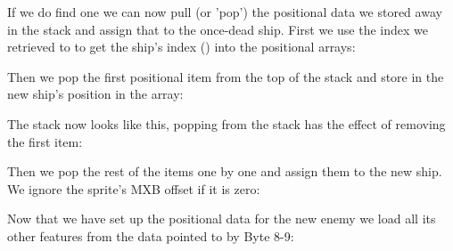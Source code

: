 %


If we do find one we can now pull (or 'pop') the positional data we stored away in the stack and assign that to the once-dead
ship. First we use the index we retrieved to  to get the ship's index () into the positional arrays:

%


Then we pop the first positional item  from the top of the stack and store in the new
ship's position in the array:

%


The stack now looks like this, popping from the stack has the effect of removing the first item:

\begin{figure}[H]
  {
    \setlength{\tabcolsep}{3.0pt}
    \setlength\cmidrulewidth{\heavyrulewidth} %
    \begin{adjustbox}{width=10cm,center}
    \end{adjustbox}

  }
\end{figure}

Then we pop the rest of the items one by one and assign them to the new ship. We ignore the sprite's MXB offset if it is
zero:
%


Now that we have set up the positional data for the new enemy we load all its other features from the data pointed
to by Byte 8-9:

%



